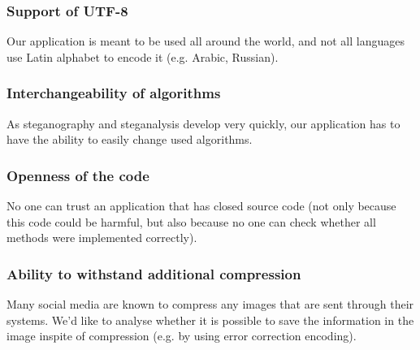 \subsubsection{Support of UTF-8}
Our application is meant to be used all around the world, and not all languages use
Latin alphabet to encode it (e.g. Arabic, Russian). 

\subsubsection{Interchangeability of algorithms}
As steganography and steganalysis develop very quickly, our application
has to have the ability to easily change used algorithms.  

\subsubsection{Openness of the code}
No one can trust an application that has closed source code (not only because
this code could be harmful, but also because no one can check whether all
methods were implemented correctly).

\subsubsection{Ability to withstand additional compression}
Many social media are known to compress any images that are sent through
their systems. We'd like to analyse whether it is possible to save the information
in the image inspite of compression (e.g. by using error correction encoding).
